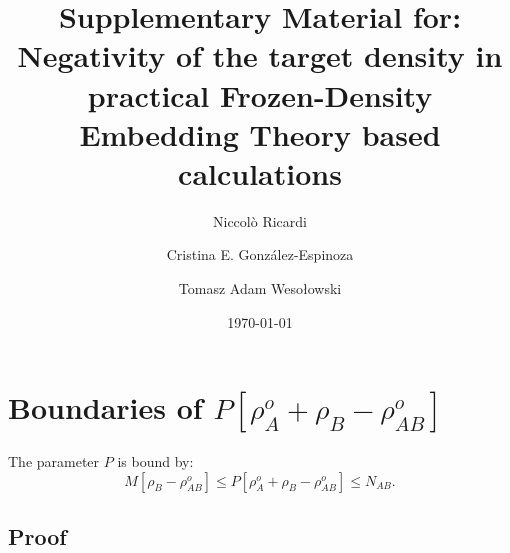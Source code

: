 \documentclass[amsmath,amssymb,preprint,aip,jcp]{revtex4-1}
\begin{document}
\author{Niccol\`{o} Ricardi}
\author{Cristina E. Gonz\'{a}lez-Espinoza}
\author{Tomasz Adam Weso\l{}owski}
% 
\date{\today}
\title{Supplementary Material for: Negativity of the target density in practical Frozen-Density Embedding Theory based calculations}

\maketitle
\section{Boundaries of $P[\rho^{o}_A + \rho_B - \rho_{AB}^o]$}
The parameter $P$ is bound by:
\begin{equation} \label{eq:P_bound_SI}
 M[\rho_{B} - \rho^{o}_{AB}] \leq P[\rho_A^o+\rho_B - \rho_{AB}^{o}] \leq %
 N_{AB}.
\end{equation}

\subsection{Proof}
\end{document}
